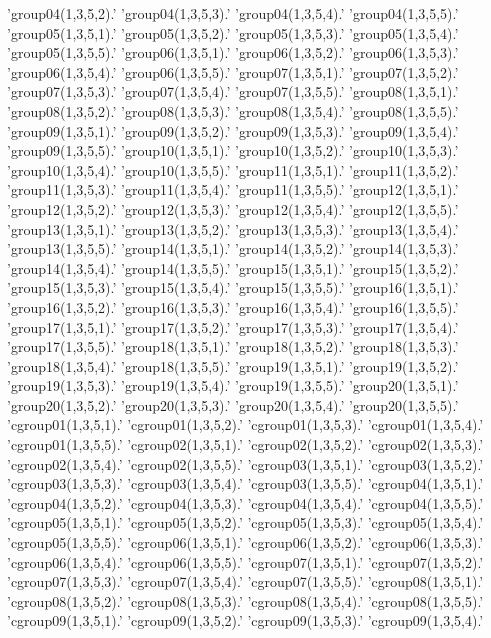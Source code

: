'group04(1,3,5,2).'
'group04(1,3,5,3).'
'group04(1,3,5,4).'
'group04(1,3,5,5).'
'group05(1,3,5,1).'
'group05(1,3,5,2).'
'group05(1,3,5,3).'
'group05(1,3,5,4).'
'group05(1,3,5,5).'
'group06(1,3,5,1).'
'group06(1,3,5,2).'
'group06(1,3,5,3).'
'group06(1,3,5,4).'
'group06(1,3,5,5).'
'group07(1,3,5,1).'
'group07(1,3,5,2).'
'group07(1,3,5,3).'
'group07(1,3,5,4).'
'group07(1,3,5,5).'
'group08(1,3,5,1).'
'group08(1,3,5,2).'
'group08(1,3,5,3).'
'group08(1,3,5,4).'
'group08(1,3,5,5).'
'group09(1,3,5,1).'
'group09(1,3,5,2).'
'group09(1,3,5,3).'
'group09(1,3,5,4).'
'group09(1,3,5,5).'
'group10(1,3,5,1).'
'group10(1,3,5,2).'
'group10(1,3,5,3).'
'group10(1,3,5,4).'
'group10(1,3,5,5).'
'group11(1,3,5,1).'
'group11(1,3,5,2).'
'group11(1,3,5,3).'
'group11(1,3,5,4).'
'group11(1,3,5,5).'
'group12(1,3,5,1).'
'group12(1,3,5,2).'
'group12(1,3,5,3).'
'group12(1,3,5,4).'
'group12(1,3,5,5).'
'group13(1,3,5,1).'
'group13(1,3,5,2).'
'group13(1,3,5,3).'
'group13(1,3,5,4).'
'group13(1,3,5,5).'
'group14(1,3,5,1).'
'group14(1,3,5,2).'
'group14(1,3,5,3).'
'group14(1,3,5,4).'
'group14(1,3,5,5).'
'group15(1,3,5,1).'
'group15(1,3,5,2).'
'group15(1,3,5,3).'
'group15(1,3,5,4).'
'group15(1,3,5,5).'
'group16(1,3,5,1).'
'group16(1,3,5,2).'
'group16(1,3,5,3).'
'group16(1,3,5,4).'
'group16(1,3,5,5).'
'group17(1,3,5,1).'
'group17(1,3,5,2).'
'group17(1,3,5,3).'
'group17(1,3,5,4).'
'group17(1,3,5,5).'
'group18(1,3,5,1).'
'group18(1,3,5,2).'
'group18(1,3,5,3).'
'group18(1,3,5,4).'
'group18(1,3,5,5).'
'group19(1,3,5,1).'
'group19(1,3,5,2).'
'group19(1,3,5,3).'
'group19(1,3,5,4).'
'group19(1,3,5,5).'
'group20(1,3,5,1).'
'group20(1,3,5,2).'
'group20(1,3,5,3).'
'group20(1,3,5,4).'
'group20(1,3,5,5).'
'cgroup01(1,3,5,1).'
'cgroup01(1,3,5,2).'
'cgroup01(1,3,5,3).'
'cgroup01(1,3,5,4).'
'cgroup01(1,3,5,5).'
'cgroup02(1,3,5,1).'
'cgroup02(1,3,5,2).'
'cgroup02(1,3,5,3).'
'cgroup02(1,3,5,4).'
'cgroup02(1,3,5,5).'
'cgroup03(1,3,5,1).'
'cgroup03(1,3,5,2).'
'cgroup03(1,3,5,3).'
'cgroup03(1,3,5,4).'
'cgroup03(1,3,5,5).'
'cgroup04(1,3,5,1).'
'cgroup04(1,3,5,2).'
'cgroup04(1,3,5,3).'
'cgroup04(1,3,5,4).'
'cgroup04(1,3,5,5).'
'cgroup05(1,3,5,1).'
'cgroup05(1,3,5,2).'
'cgroup05(1,3,5,3).'
'cgroup05(1,3,5,4).'
'cgroup05(1,3,5,5).'
'cgroup06(1,3,5,1).'
'cgroup06(1,3,5,2).'
'cgroup06(1,3,5,3).'
'cgroup06(1,3,5,4).'
'cgroup06(1,3,5,5).'
'cgroup07(1,3,5,1).'
'cgroup07(1,3,5,2).'
'cgroup07(1,3,5,3).'
'cgroup07(1,3,5,4).'
'cgroup07(1,3,5,5).'
'cgroup08(1,3,5,1).'
'cgroup08(1,3,5,2).'
'cgroup08(1,3,5,3).'
'cgroup08(1,3,5,4).'
'cgroup08(1,3,5,5).'
'cgroup09(1,3,5,1).'
'cgroup09(1,3,5,2).'
'cgroup09(1,3,5,3).'
'cgroup09(1,3,5,4).'

